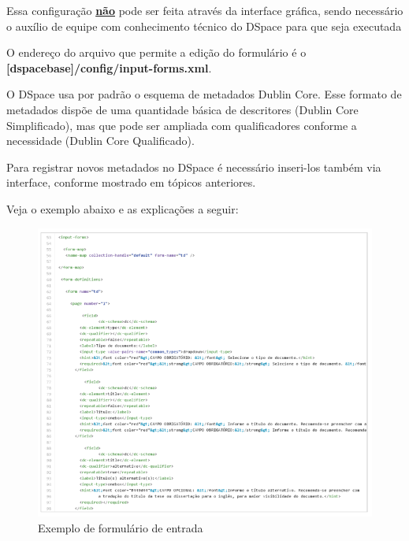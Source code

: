 \documentclass[12pt,hidelinks]{article}
\begin{document}
    \singlespacing
    
    Essa configuração \underline{\textbf{não}} pode ser feita através da interface gráfica, sendo necessário o auxílio de equipe com conhecimento técnico do DSpace para que seja executada
    
    \singlespacing
    
    O endereço do arquivo que permite a edição do formulário é o \textbf{[dspacebase]/config/input-forms.xml}.
    
    \singlespacing
    
    O DSpace usa por padrão o esquema de metadados Dublin Core. Esse formato de metadados dispõe de uma quantidade básica de descritores (Dublin Core Simplificado), mas que pode ser ampliada com qualificadores conforme a necessidade (Dublin Core Qualificado).
    
    \singlespacing
    
    Para registrar novos metadados no DSpace é necessário inseri-los também via interface, conforme mostrado em tópicos anteriores.
    
    Veja o exemplo abaixo e as explicações a seguir:
    
    \begin{figure}[!htp]
                \centering
                \includegraphics[scale=0.6]{figura/Figura180.png}
                \caption{Exemplo de formulário de entrada}
            \label{Rotulo}
        \end{figure}
        
\end{document}
